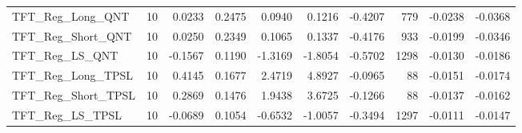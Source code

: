\begin{tabular}{llrrrrrrrr}
\cline{1-10}
TFT\_Reg\_Long\_QNT & 10 & 0.0233 & 0.2475 & 0.0940 & 0.1216 & -0.4207 & 779 & -0.0238 & -0.0368 \\
\cline{1-10}
TFT\_Reg\_Short\_QNT & 10 & 0.0250 & 0.2349 & 0.1065 & 0.1337 & -0.4176 & 933 & -0.0199 & -0.0346 \\
\cline{1-10}
TFT\_Reg\_LS\_QNT & 10 & -0.1567 & 0.1190 & -1.3169 & -1.8054 & -0.5702 & 1298 & -0.0130 & -0.0186 \\
\cline{1-10}
TFT\_Reg\_Long\_TPSL & 10 & 0.4145 & 0.1677 & 2.4719 & 4.8927 & -0.0965 & 88 & -0.0151 & -0.0174 \\
\cline{1-10}
TFT\_Reg\_Short\_TPSL & 10 & 0.2869 & 0.1476 & 1.9438 & 3.6725 & -0.1266 & 88 & -0.0137 & -0.0162 \\
\cline{1-10}
TFT\_Reg\_LS\_TPSL & 10 & -0.0689 & 0.1054 & -0.6532 & -1.0057 & -0.3494 & 1297 & -0.0111 & -0.0147 \\
\cline{1-10}
\bottomrule
\end{tabular}
